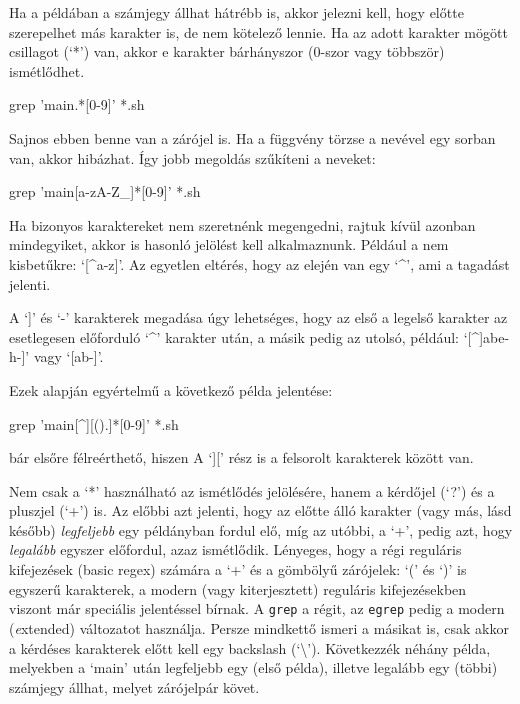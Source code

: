 Ha a példában a számjegy állhat hátrébb is, akkor jelezni kell, hogy előtte
szerepelhet más karakter is, de nem kötelező lennie. Ha az adott karakter mögött
csillagot (`*') van, akkor e karakter bárhányszor (0-szor vagy többször)
ismétlődhet.

\begin{VerbExample}
 grep 'main.*[0-9]' *.sh
\end{VerbExample}

Sajnos ebben benne van  a zárójel is. Ha a függvény törzse a nevével egy sorban
van, akkor hibázhat. Így jobb megoldás szűkíteni a neveket:

\begin{VerbExample}
grep 'main[a-zA-Z_]*[0-9]' *.sh    
\end{VerbExample}

Ha bizonyos karaktereket nem szeretnénk megengedni, rajtuk kívül azonban
mindegyiket, akkor is hasonló jelölést kell alkalmaznunk. Például a nem
kisbetűkre: `[\^{}a-z]'. Az egyetlen eltérés, hogy az elején van egy `\^{}', ami
a tagadást jelenti.

A `]' és `-' karakterek megadása úgy lehetséges, hogy az első a legelső karakter
az esetlegesen előforduló `\^{}' karakter után, a másik pedig az utolsó,
például: `[\^{}]abe-h-]' vagy `[ab-]'. 

Ezek alapján egyértelmű a következő példa jelentése:\\

\begin{VerbExample}
grep 'main[^][().{}]*[0-9]' *.sh
\end{VerbExample}

\noindent bár elsőre félreérthető, hiszen A `][' rész is a felsorolt karakterek
között van.

Nem csak a `*' használható az ismétlődés jelölésére, hanem a kérdőjel (`?') és a
pluszjel (`+') is. Az előbbi azt jelenti, hogy az előtte álló karakter (vagy
más, lásd később) \emph{legfeljebb} egy példányban fordul elő, míg az utóbbi, a
`+', pedig azt, hogy \emph{legalább} egyszer előfordul, azaz
ismétlődik. Lényeges, hogy a régi reguláris kifejezések (basic regex) számára a
`+' és a gömbölyű zárójelek: `(' és `)' is egyszerű karakterek, a modern (vagy
kiterjesztett) reguláris kifejezésekben viszont már speciális jelentéssel
bírnak. A \texttt{grep} a régit, az \texttt{egrep} pedig a modern
(\emph{e}xtended) változatot használja. Persze mindkettő ismeri a másikat is,
csak akkor a kérdéses karakterek előtt kell egy backslash
(`\textbackslash'). Következzék néhány példa, melyekben a `main' után legfeljebb
egy (első példa), illetve legalább egy (többi) számjegy állhat, melyet
zárójelpár követ.

